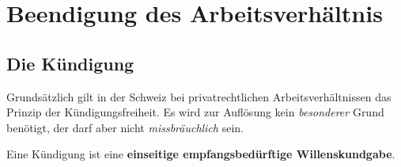 















\section{Beendigung des Arbeitsverhältnis}
\subsection{Die Kündigung}
Grundsätzlich gilt in der Schweiz bei privatrechtlichen Arbeitsverhältnissen das Prinzip der Kündigungsfreiheit. Es wird zur Auflösung kein \textit{besonderer} Grund benötigt, der darf aber nicht \textit{missbräuchlich} sein.

Eine Kündigung ist eine \textbf{einseitige empfangsbedürftige Willenskundgabe}.

